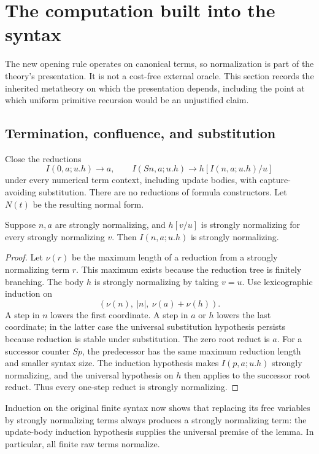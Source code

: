 \section{The computation built into the syntax}
\label{sec:normalization}

The new opening rule operates on canonical terms, so normalization is part
of the theory's presentation.  It is not a cost-free external oracle.
This section records the inherited metatheory on which the presentation
depends, including the point at which uniform primitive recursion would be
an unjustified claim.\cite{fullnf}

\subsection{Termination, confluence, and substitution}

Close the reductions
\[
 I(0,a;u.h)\longrightarrow a,
 \qquad
 I(Sn,a;u.h)\longrightarrow h[I(n,a;u.h)/u]
\]
under every numerical term context, including update bodies, with
capture-avoiding substitution.  There are no reductions of formula
constructors.  Let $N(t)$ be the resulting normal form.

\begin{lemma}
Suppose $n,a$ are strongly normalizing, and $h[v/u]$ is strongly
normalizing for every strongly normalizing $v$.  Then $I(n,a;u.h)$ is
strongly normalizing.
\end{lemma}
\begin{proof}
Let $\nu(r)$ be the maximum length of a reduction from a strongly
normalizing term $r$.  This maximum exists because the reduction tree is
finitely branching.  The body $h$ is strongly normalizing by taking $v=u$.
Use lexicographic induction on
\[
       (\nu(n),\ |n|,\ \nu(a)+\nu(h)).
\]
A step in $n$ lowers the first coordinate.  A step in $a$ or $h$ lowers
the last coordinate; in the latter case the universal substitution
hypothesis persists because reduction is stable under substitution.
The zero root reduct is $a$.  For a successor counter $Sp$, the predecessor
has the same maximum reduction length and smaller syntax size.  The
induction hypothesis makes $I(p,a;u.h)$ strongly normalizing, and the
universal hypothesis on $h$ then applies to the successor root reduct.
Thus every one-step reduct is strongly normalizing.
\end{proof}

Induction on the original finite syntax now shows that replacing its free
variables by strongly normalizing terms always produces a strongly
normalizing term: the update-body induction hypothesis supplies the
universal premise of the lemma.  In particular, all finite raw terms
normalize.

